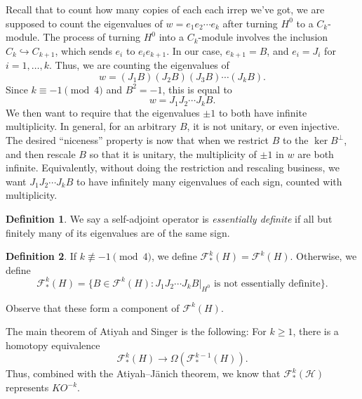 \documentclass{shortart}
\theoremstyle{definition}
\newtheorem*{defi}{Definition}
\newenvironment{customthm}[1]
  {\renewcommand\theinnercustomthm{#1}\innercustomthm}
  {\endinnercustomthm}
\begin{document}
Recall that to count how many copies of each each irrep we've got, we are supposed to count the eigenvalues of $w = e_1 e_2 \cdots e_k$ after turning $H^0$ to a $C_k$-module. The process of turning $H^0$ into a $C_k$-module involves the inclusion $C_k \hookrightarrow C_{k + 1}$, which sends $e_i$ to $e_i e_{k + 1}$. In our case, $e_{k + 1} = B$, and $e_i = J_i$ for $i = 1, \ldots, k$. Thus, we are counting the eigenvalues of
\[
  w = (J_1 B) (J_2 B)(J_3 B) \cdots (J_k B).
\]
Since $k \equiv -1 \pmod 4$ and $B^2 = -1$, this is equal to
\[
  w = J_1 J_2 \cdots J_k B.
\]
We then want to require that the eigenvalues $\pm 1$ to both have infinite multiplicity. In general, for an arbitrary $B$, it is not unitary, or even injective. The desired ``niceness'' property is now that when we restrict $B$ to the $\ker B^\perp$, and then rescale $B$ so that it is unitary, the multiplicity of $\pm 1$ in $w$ are both infinite. Equivalently, without doing the restriction and rescaling business, we want $J_1 J_2 \cdots J_k B$ to have infinitely many eigenvalues of each sign, counted with multiplicity.

\begin{defi}
  We say a self-adjoint operator is \emph{essentially definite} if all but finitely many of its eigenvalues are of the same sign.
\end{defi}

\begin{defi}
  If $k \not\equiv -1\pmod 4$, we define $\mathcal{F}^k_*(H) = \mathcal{F}^k(H)$. Otherwise, we define
  \[
    \mathcal{F}^k_*(H) = \{B \in \mathcal{F}^k(H): J_1 J_2 \cdots J_k B|_{H^0}\text{ is not essentially definite}\}.
  \]
\end{defi}
Observe that these form a component of $\mathcal{F}^k(H)$.

The main theorem of Atiyah and Singer is the following:
\begin{customthm}{A}
  For $k \geq 1$, there is a homotopy equivalence
  \[
    \mathcal{F}^k_*(H) \to \Omega (\mathcal{F}^{k - 1}_*(H)).
  \]
  Thus, combined with the Atiyah--J\"anich theorem, we know that $\mathcal{F}^k_*(\mathcal{H})$ represents $KO^{-k}$.
\end{customthm}
\end{document}
